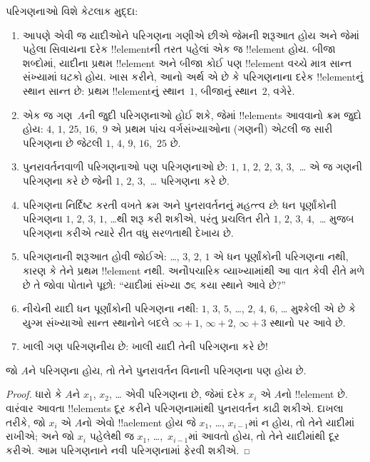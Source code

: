 \documentclass[../../../include/open-logic-section]{subfiles}
\begin{document}
\begin{explain}
પરિગણનાઓ વિશે કેટલાક મુદ્દા:
\begin{enumerate}
\item આપણે એવી જ યાદીઓને પરિગણના ગણીએ છીએ જેમની
  શરૂઆત હોય અને જેમાં પહેલા સિવાયના દરેક !!{element}ની
  તરત પહેલાં એક જ !!{element} હોય. બીજા શબ્દોમાં,
  યાદીના પ્રથમ !!{element} અને બીજા કોઈ પણ !!{element}
  વચ્ચે માત્ર સાન્ત સંખ્યામાં ઘટકો હોય. ખાસ કરીને,
  આનો અર્થ એ છે કે પરિગણનાના દરેક !!{element}નું
  સ્થાન સાન્ત છે: પ્રથમ !!{element}નું સ્થાન~$1$,
  બીજાનું સ્થાન~$2$, વગેરે.
\item એક જ ગણ~$A$ની જુદી પરિગણનાઓ હોઈ શકે,
  જેમાં !!{element}s આવવાનો ક્રમ જુદો હોય:
  $4$, $1$, $25$, $16$,~$9$ એ પ્રથમ પાંચ
  વર્ગસંખ્યાઓના (ગણની) એટલી જ સારી પરિગણના છે
  જેટલી $1$, $4$, $9$, $16$,~$25$ છે.
\item પુનરાવર્તનવાળી પરિગણનાઓ પણ પરિગણનાઓ છે:
  $1$, $1$, $2$, $2$, $3$, $3$,~\dots{}
  એ જ ગણની પરિગણના કરે છે જેની $1$, $2$,
  $3$,~\dots{} પરિગણના કરે છે.
\item પરિગણના નિર્દિષ્ટ કરતી વખતે ક્રમ અને પુનરાવર્તનનું
  મહત્ત્વ \emph{છે}: ધન પૂર્ણાંકોની પરિગણના
  $1$, $2$, $3$, $1$, \dots{}થી શરૂ કરી શકીએ,
  પરંતુ પ્રચલિત રીતે $1$, $2$, $3$, $4$,~\dots
  મુજબ પરિગણના કરીએ ત્યારે રીત વધુ સરળતાથી દેખાય છે.
\item પરિગણનાની શરૂઆત હોવી જોઈએ: \dots, $3$, $2$, $1$
  એ ધન પૂર્ણાંકોની પરિગણના નથી, કારણ કે તેને પ્રથમ
  !!{element} નથી. અનૌપચારિક વ્યાખ્યામાંથી આ વાત
  કેવી રીતે મળે છે તે જોવા પોતાને પૂછો: “યાદીમાં
  સંખ્યા ૭૬ કયા સ્થાને આવે છે?”
\item નીચેની યાદી ધન પૂર્ણાંકોની પરિગણના નથી:
  $1$, $3$, $5$, \dots, $2$, $4$, $6$, \dots\@
  મુશ્કેલી એ છે કે યુગ્મ સંખ્યાઓ સાન્ત સ્થાનોને બદલે
  $\infty + 1$, $\infty + 2$, $\infty +
  3$ સ્થાનો પર આવે છે.
\item ખાલી ગણ પરિગણનીય છે: ખાલી યાદી તેની પરિગણના કરે છે!{}
\end{enumerate}
\end{explain}

\begin{prop}
જો $A$ને પરિગણના હોય, તો તેને પુનરાવર્તન વિનાની
પરિગણના પણ હોય છે.
\end{prop}

\begin{proof}
ધારો કે $A$ને $x_1$, $x_2$, \dots{} એવી પરિગણના
છે, જેમાં દરેક $x_i$ એ $A$નો !!{element} છે.
વારંવાર આવતા !!{element}s દૂર કરીને પરિગણનામાંથી
પુનરાવર્તન કાઢી શકીએ. દાખલા તરીકે, જો $x_i$ એ
$A$નો એવો !!a{element} હોય જે $x_1$, \dots,
$x_{i-1}$માં ન હોય, તો તેને યાદીમાં રાખીએ;
અને જો $x_i$ પહેલેથી જ $x_1$, \dots,~$x_{i-1}$માં
આવતો હોય, તો તેને યાદીમાંથી દૂર કરીએ. આમ પરિગણનાને
નવી પરિગણનામાં ફેરવી શકીએ.
\end{proof}
\end{document}
